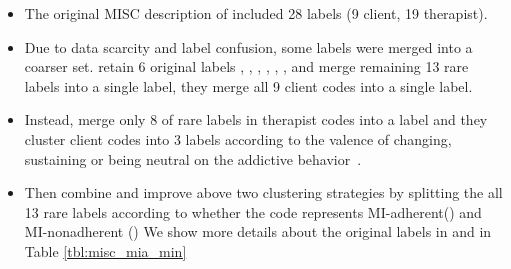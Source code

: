 \begin{itemize}
\item {} The original MISC description of
  \citet{miller2003manual} included 28 labels (9 client, 19
  therapist).

\item {} Due to data scarcity and label confusion, some
labels were merged into a coarser set.  \citet{can2015dialog} retain 6
original labels \FA, \GI, \QUC, \QUO, \REC, \RES, and merge remaining
13 rare labels into a single  label, they merge all 9 client
codes into a single  label.

\item {} Instead, \citet{tanana2016comparison} merge only 8
of rare labels in therapist codes into a  label and they
cluster client codes into 3 labels according to the valence of
changing, sustaining or being neutral on the addictive
behavior~\cite{atkins2014scaling}.

\item {} Then \citet{xiao2016behavioral} combine and
improve above two clustering strategies by splitting the all 13 rare
labels according to whether the code represents MI-adherent(\MIA) and
MI-nonadherent (\MIN) We show more details about the original labels
in \MIA and \MIN in Table \ref{tbl:misc_mia_min}
\end{itemize}

